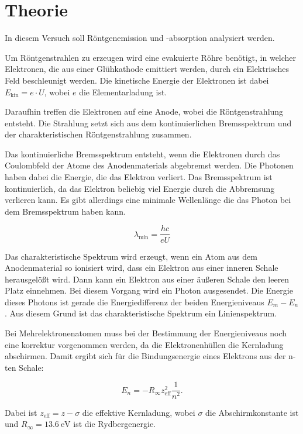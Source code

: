 \section{Theorie}

In diesem Versuch soll Röntgenemission und -absorption analysiert werden.

Um Röntgenstrahlen zu erzeugen wird eine evakuierte Röhre benötigt, in welcher
Elektronen, die aus einer Glühkathode emittiert werden, durch ein Elektrisches
Feld beschleunigt werden. Die kinetische Energie der Elektronen ist dabei
$E_\text{kin} = e \cdot U$, wobei $e$ die Elementarladung ist.

Daraufhin treffen die Elektronen auf eine Anode, wobei die Röntgenstrahlung
entsteht. Die Strahlung setzt sich aus dem kontinuierlichen Bremsspektrum und
der charakteristischen Röntgenstrahlung zusammen.

Das kontinuierliche Bremsspektrum entsteht, wenn die Elektronen durch das Coulombfeld
der Atome des Anodenmaterials abgebremst werden. Die Photonen haben dabei die Energie,
die das Elektron verliert. Das Bremsspektrum ist kontinuierlich, da das Elektron
beliebig viel Energie durch die Abbremsung verlieren kann. Es gibt allerdings
eine minimale Wellenlänge die das Photon bei dem Bremsspektrum haben kann.

\begin{equation}
  \lambda_\text{min} = \frac{hc}{eU}
  \label{eq:1}
\end{equation}

Das charakteristische Spektrum wird erzeugt, wenn ein Atom aus dem Anodenmaterial
so ionisiert wird, dass ein Elektron aus einer inneren Schale herausgelößt wird.
Dann kann ein Elektron aus einer äußeren Schale den leeren Platz einnehmen. Bei
diesem Vorgang wird ein Photon ausgesendet. Die Energie dieses Photons ist gerade
die Energiedifferenz der beiden Energieniveaus $E_m - E_n$. Aus diesem Grund ist das
charakteristische Spektrum ein Linienspektrum.

Bei Mehrelektronenatomen muss bei der Bestimmung der Energieniveaus noch eine
korrektur vorgenommen werden, da die Elektronenhüllen die Kernladung abschirmen.
Damit ergibt sich für die Bindungsenergie eines Elektrons aus der n-ten Schale:

\begin{equation}
  E_n = - R_\infty z_\text{eff}^2 \frac{1}{n^2}.
  \label{eq:2}
\end{equation}

Dabei ist $z_\text{eff} = z - \sigma$ die effektive Kernladung, wobei $\sigma$
die Abschirmkonstante ist und $R_\infty = \SI{13.6}{\eV}$ ist die
Rydbergenergie. \\\\

